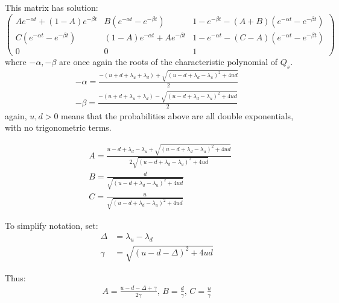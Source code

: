 \documentclass[11pt]{paper}
\begin{document}
This matrix has solution:
\begin{equation}
\begin{pmatrix}
Ae^{-\alpha t} + (1-A)e^{-\beta t} & B\left(e^{-\alpha t} - e^{-\beta t}\right) & 1-e^{-\beta t} - (A+B)\left(e^{-\alpha t} - e^{-\beta t}\right) \\
C\left(e^{-\alpha t} - e^{-\beta t}\right) & (1-A)e^{-\alpha t} + Ae^{-\beta t} & 1-e^{-\alpha t} - (C-A)\left(e^{-\alpha t} - e^{-\beta t}\right)\\
0 & 0 & 1
\end{pmatrix}
\end{equation}
where $-\alpha,-\beta$ are once again the roots of the characteristic polynomial of $Q_s$.
\begin{equation}
\begin{split}
-\alpha = \frac{-(u+d+\lambda_u+\lambda_d) + \sqrt{(u-d+\lambda_d-\lambda_u)^2+4ud}}{2}\\
-\beta = \frac{-(u+d+\lambda_u+\lambda_d) - \sqrt{(u-d+\lambda_d-\lambda_u)^2+4ud}}{2}
\end{split}
\end{equation}
again, $u,d>0$ means that the probabilities above are all double exponentials, with no trigonometric terms.

\begin{equation}
\begin{split}
& A = \frac{u-d+\lambda_d-\lambda_u + \sqrt{(u-d+\lambda_d-\lambda_u)^2+4ud}}{2\sqrt{(u-d+\lambda_d-\lambda_u)^2 + 4ud}}\\
& B = \frac{d}{\sqrt{(u-d+\lambda_d-\lambda_u)^2 + 4ud}}\\
& C = \frac{u}{\sqrt{(u-d+\lambda_d-\lambda_u)^2 + 4ud}}
\end{split}
\end{equation}

To simplify notation, set:
\begin{equation}
\begin{split}
\label{dg}
\Delta &= \lambda_u - \lambda_d\\
\gamma &= \sqrt{(u-d-\Delta)^2 + 4ud}
\end{split}
\end{equation}

Thus:
\begin{equation}
\begin{split}
A = \frac{u-d - \Delta + \gamma}{2\gamma},\, B = \frac{d}{\gamma}, \,C = \frac{u}{\gamma}
\end{split}
\end{equation}
\end{document}
